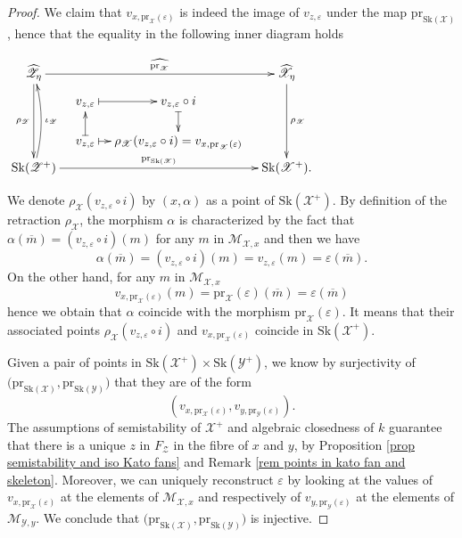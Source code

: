\documentclass{amsart}%
\numberwithin{equation}{subsection}
\theoremstyle{plain2}
\theoremstyle{definition2}
\theoremstyle{stepstyle}
\theoremstyle{point}
\theoremstyle{subpoint}
\newcommand{\cX}{\ensuremath{\mathscr{X}}}
\newcommand{\caM}{\ensuremath{\mathcal{M}}}
\newcommand{\cY}{\ensuremath{\mathscr{Y}}}
\newcommand{\cZ}{\ensuremath{\mathscr{Z}}}
\renewcommand{\cZ}{\ensuremath{\mathscr{Z}}}
\renewcommand{\cY}{\ensuremath{\mathscr{Y}}}
\newcommand{\pr}{\mathrm{pr}}
\newcommand{\Sk}{\mathrm{Sk}}
\begin{document}
\begin{proof}
We claim that $v_{x, \pr_{\cX}(\varepsilon)}$ is indeed the image of $v_{z,\varepsilon}$ under the map $\pr_{\Sk(\cX)}$, hence that the equality in the following inner diagram holds
\begin{center} 
$\begin{gathered}
\xymatrixcolsep{0.8pc}\xymatrixrowsep{0.4pc} \xymatrix{
 \widehat{\cZ_{\eta}} \ar[rrr]^-{\widehat{\pr_{\cX}}} \ar[dddd]_{\rho_\cZ} & & & \widehat{\cX_{\eta}}\ar[dddd]^{\rho_\cX}\\
 \footnotesize & v_{z,\varepsilon} \ar@{|->}[r] &  v_{z,\varepsilon} \circ i\ar@{|->}[dd] & \\
 & & & \\
 & v_{z,\varepsilon} \ar@{|->}[uu] \ar@{|->}[r] & \rho_\cX(v_{z,\varepsilon} \circ i) = v_{x, \pr_{\cX}(\varepsilon)}& \\
 \normalsize \Sk(\cZ^+) \ar[rrr]^-{\pr_{\Sk(\cX)}} \ar@/_/[uuuu]_-{\iota_\cZ}  & & & \Sk(\cX^+).
}
\end{gathered}$\end{center} We denote $\rho_\cX(v_{z,\varepsilon} \circ i)$ by $(x,\alpha)$ as a point of $\Sk(\cX^+)$. By definition of the retraction $\rho_\cX$, the morphism $\alpha$ is characterized by the fact that $\alpha(\overline{m})= (v_{z,\varepsilon} \circ i )(m)$ for any $m$ in $\caM_{\cX,x}$ and then we have $$\alpha(\overline{m})= (v_{z,\varepsilon} \circ i )(m) = v_{z,\varepsilon}(m)= \varepsilon(\overline{m}).$$ On the other hand, for any $m$ in $\caM_{\cX,x}$ $$v_{x,\pr_{\cX}(\varepsilon)}(m)= \pr_{\cX}(\varepsilon) (\overline{m}) = \varepsilon(\overline{m})$$ hence we obtain that $\alpha$ coincide with the morphism $\pr_{\cX}(\varepsilon)$. It means that their associated points $\rho_\cX(v_{z,\varepsilon} \circ i)$ and $v_{x, \pr_{\cX}(\varepsilon)}$ coincide in $\Sk(\cX^+)$.

Given a pair of points in $\Sk(\cX^+) \times \Sk(\cY^+)$, we know by surjectivity of $\big(\pr_{\Sk(\cX)}, \pr_{\Sk(\cY)}\big)$  that they are of the form $$(v_{x, \pr_{\cX}(\varepsilon)}, v_{y, \pr_{\cY}(\varepsilon)}).$$ The assumptions of semistability of $\cX^+$ and algebraic closedness of $k$ guarantee that there is a unique $z$ in $F_\cZ$ in the fibre of $x$ and $y$, by Proposition \ref{prop semistability and iso Kato fans} and Remark \ref{rem points in kato fan and skeleton}. Moreover, we can uniquely reconstruct $\varepsilon$ by looking at the values of $v_{x, \pr_{\cX}(\varepsilon)}$ at the elements of $\caM_{\cX,x}$ and respectively of $v_{y, \pr_{\cY}(\varepsilon)}$ at the elements of $\caM_{\cY,y}$. We conclude that $\big(\pr_{\Sk(\cX)}, \pr_{\Sk(\cY)}\big)$  is injective.
\end{proof}
\end{document}
